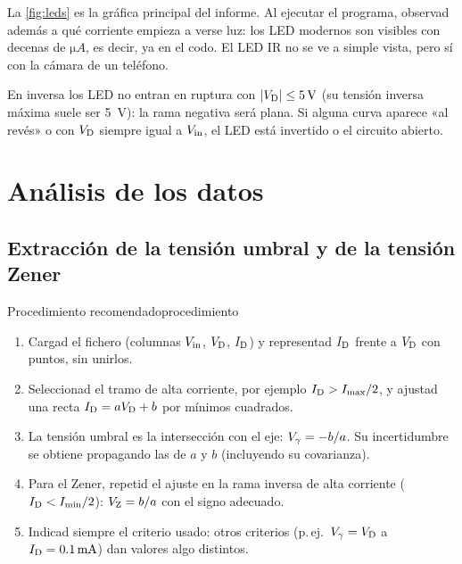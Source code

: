 \documentclass[11pt,a4paper]{article}
\begin{document}
La \cref{fig:leds} es la gráfica principal del informe. Al ejecutar el
programa, observad además a qué corriente empieza a verse luz: los LED
modernos son visibles con decenas de $\si{\micro A}$, es decir, ya en el codo.
El LED IR no se ve a simple vista, pero sí con la cámara de un teléfono.

\begin{observacion}
  En inversa los LED no entran en ruptura con $|V_{\mathrm D}|\le\SI{5}{V}$ (su
  tensión inversa máxima suele ser \SI{5}{V}): la rama negativa será plana. Si
  alguna curva aparece «al revés» o con $V_{\mathrm D}$ siempre igual a $V_{\mathrm{in}}$, el LED
  está invertido o el circuito abierto.
\end{observacion}

\section{Análisis de los datos}
\label{sec:analisis}

\subsection{Extracción de la tensión umbral y de la tensión Zener}

\begin{laboratorio}{Procedimiento recomendado}{procedimiento}
  \begin{enumerate}[leftmargin=2em]
    \item Cargad el fichero (columnas $V_{\mathrm{in}}$, $V_{\mathrm D}$, $I_{\mathrm D}$) y representad
      $I_{\mathrm D}$ frente a $V_{\mathrm D}$ con puntos, sin unirlos.
    \item Seleccionad el tramo de alta corriente, por ejemplo
      $I_{\mathrm D}>I_{\max}/2$, y ajustad una recta $I_{\mathrm D}=aV_{\mathrm D}+b$ por mínimos
      cuadrados.
    \item La tensión umbral es la intersección con el eje: $V_{\gamma}=-b/a$. Su
      incertidumbre se obtiene propagando las de $a$ y $b$ (incluyendo su
      covarianza).
    \item Para el Zener, repetid el ajuste en la rama inversa de alta corriente
      ($I_{\mathrm D}<I_{\min}/2$): $V_{\mathrm Z}=b/a$ con el signo adecuado.
    \item Indicad siempre el criterio usado: otros criterios (p.\,ej.\
      $V_{\gamma}=V_{\mathrm D}$ a $I_{\mathrm D}=\SI{0.1}{mA}$) dan valores algo distintos.
  \end{enumerate}
\end{laboratorio}
\end{document}
